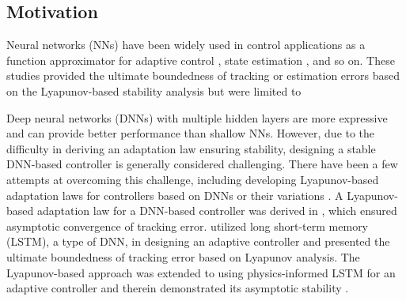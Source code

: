 \documentclass[letterpaper, journal]{IEEEtran}
\begin{document}
\subsection{Motivation}
Neural networks (NNs) have been widely used in control applications as a function approximator for adaptive control \cite{BookEKcontrol}, state estimation \cite{BoockEKestimation}, and so on. 
These studies provided the ultimate boundedness of tracking or estimation errors based on the Lyapunov-based stability analysis but were limited to

Deep neural networks (DNNs) with multiple hidden layers are more expressive and can provide better performance than shallow NNs. However, due to the difficulty in deriving an adaptation law ensuring stability, designing a stable DNN-based controller is generally considered challenging. There have been a few attempts at overcoming this challenge, including developing Lyapunov-based adaptation laws for controllers based on DNNs or their variations \cite{DixonDNN, DixonLSTM, DixonPINN}. A Lyapunov-based adaptation law for a DNN-based controller was derived in \cite{DixonDNN}, which ensured asymptotic convergence of tracking error. \cite{DixonLSTM} utilized long short-term memory (LSTM), a type of DNN, in designing an adaptive controller and presented the ultimate boundedness of tracking error based on Lyapunov analysis.
The Lyapunov-based approach was extended to using physics-informed LSTM for an adaptive controller and therein demonstrated its asymptotic stability \cite{DixonPINN}.
\end{document}
